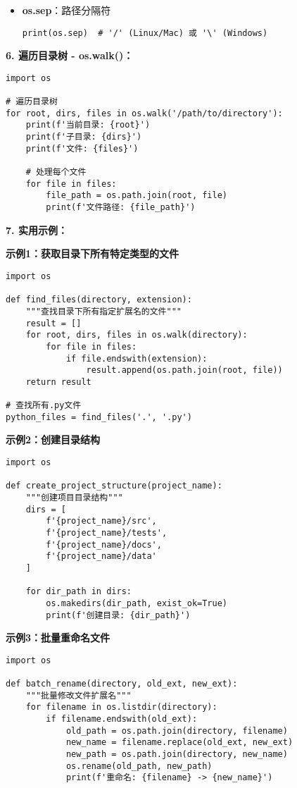 \begin{mdframed}
\begin{itemize}
    \item \textbf{os.sep}：路径分隔符
    \begin{lstlisting}
print(os.sep)  # '/' (Linux/Mac) 或 '\' (Windows)
    \end{lstlisting}
  \end{itemize}

  \textbf{6. 遍历目录树 - os.walk()：}
  \begin{lstlisting}
import os

# 遍历目录树
for root, dirs, files in os.walk('/path/to/directory'):
    print(f'当前目录: {root}')
    print(f'子目录: {dirs}')
    print(f'文件: {files}')

    # 处理每个文件
    for file in files:
        file_path = os.path.join(root, file)
        print(f'文件路径: {file_path}')
  \end{lstlisting}

  \textbf{7. 实用示例：}

  \textbf{示例1：获取目录下所有特定类型的文件}
  \begin{lstlisting}
import os

def find_files(directory, extension):
    """查找目录下所有指定扩展名的文件"""
    result = []
    for root, dirs, files in os.walk(directory):
        for file in files:
            if file.endswith(extension):
                result.append(os.path.join(root, file))
    return result

# 查找所有.py文件
python_files = find_files('.', '.py')
  \end{lstlisting}

  \textbf{示例2：创建目录结构}
  \begin{lstlisting}
import os

def create_project_structure(project_name):
    """创建项目目录结构"""
    dirs = [
        f'{project_name}/src',
        f'{project_name}/tests',
        f'{project_name}/docs',
        f'{project_name}/data'
    ]

    for dir_path in dirs:
        os.makedirs(dir_path, exist_ok=True)
        print(f'创建目录: {dir_path}')
  \end{lstlisting}

  \textbf{示例3：批量重命名文件}
  \begin{lstlisting}
import os

def batch_rename(directory, old_ext, new_ext):
    """批量修改文件扩展名"""
    for filename in os.listdir(directory):
        if filename.endswith(old_ext):
            old_path = os.path.join(directory, filename)
            new_name = filename.replace(old_ext, new_ext)
            new_path = os.path.join(directory, new_name)
            os.rename(old_path, new_path)
            print(f'重命名: {filename} -> {new_name}')
  \end{lstlisting}


\end{mdframed}
